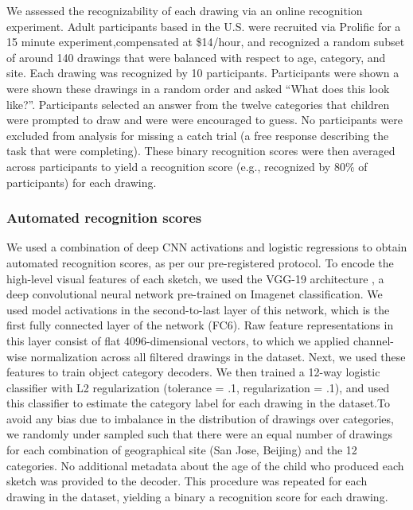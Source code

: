 \documentclass[
  english,
  man]{apa6}
\begin{document}
We assessed the recognizability of each drawing via an online recognition experiment. Adult participants based in the U.S. were recruited via Prolific for a 15 minute experiment,compensated at \$14/hour, and recognized a random subset of around 140 drawings that were balanced with respect to age, category, and site. Each drawing was recognized by 10 participants. Participants were shown a were shown these drawings in a random order and asked \enquote{What does this look like?}. Participants selected an answer from the twelve categories that children were prompted to draw and were were encouraged to guess. No participants were excluded from analysis for missing a catch trial (a free response describing the task that were completing). These binary recognition scores were then averaged across participants to yield a recognition score (e.g., recognized by 80\% of participants) for each drawing.

\hypertarget{automated-recognition-scores}{%
\subsubsection{Automated recognition scores}\label{automated-recognition-scores}}

We used a combination of deep CNN activations and logistic regressions to obtain automated recognition scores, as per our pre-registered protocol. To encode the high-level visual features of each sketch, we used the VGG-19 architecture \cite{simonyan2014very}, a deep convolutional neural network pre-trained on Imagenet classification. We used model activations in the second-to-last layer of this network, which is the first fully connected layer of the network (FC6). Raw feature representations in this layer consist of flat 4096-dimensional vectors, to which we applied channel-wise normalization across all filtered drawings in the dataset. Next, we used these features to train object category decoders. We then trained a 12-way logistic classifier with L2 regularization (tolerance = .1, regularization = .1), and used this classifier to estimate the category label for each drawing in the dataset.To avoid any bias due to imbalance in the distribution of drawings over categories, we randomly under sampled such that there were an equal number of drawings for each combination of geographical site (San Jose, Beijing) and the 12 categories. No additional metadata about the age of the child who produced each sketch was provided to the decoder. This procedure was repeated for each drawing in the dataset, yielding a binary a recognition score for each drawing.
\end{document}
